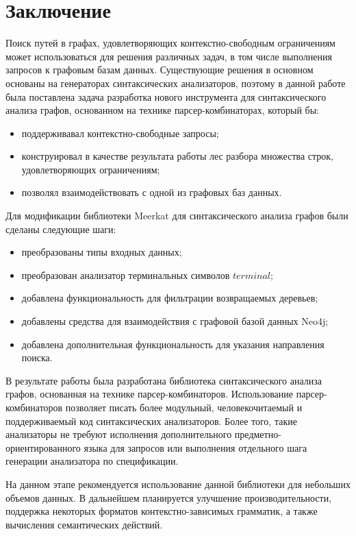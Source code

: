 \section*{Заключение}
Поиск путей в графах, удовлетворяющих контекстно-свободным ограничениям может использоваться для решения различных задач, в том числе выполнения запросов к графовым базам данных. Существующие решения в основном основаны на генераторах синтаксических анализаторов, поэтому в данной работе была поставлена задача разработка нового инструмента для синтаксического анализа графов, основанном на технике парсер-комбинаторах, который бы:

\begin{itemize}
\item поддерживавал контекстно-свободные запросы;
\item конструировал в качестве результата работы лес разбора множества строк, удовлетворяющих ограничениям;
\item позволял взаимодействовать с одной из графовых баз данных.
\end{itemize}

Для модификации библиотеки Meerkat для синтаксического анализа графов были сделаны следующие шаги:
\begin{itemize}
\item преобразованы типы входных данных;
\item преобразован анализатор терминальных символов $terminal$;
\item добавлена функциональность для фильтрации возвращаемых деревьев;
\item добавлены средства для взаимодействия с графовой базой данных Neo4j;
\item добавлена дополнительная функциональность для указания направления поиска.
\end{itemize}

В результате работы была разработана библиотека синтаксического анализа графов, основанная на технике парсер-комбинаторов. Использование парсер-комбинаторов позволяет писать более модульный, человекочитаемый и поддерживаемый код синтаксических анализаторов. Более того, такие анализаторы не требуют исполнения дополнительного предметно-ориентированного языка для запросов или выполнения отдельного шага генерации анализатора по спецификации.

На данном этапе рекомендуется использование данной библиотеки для небольших объемов данных. В дальнейшем планируется улучшение производительности, поддержка некоторых форматов контекстно-зависимых грамматик, а также вычисления семантических действий.